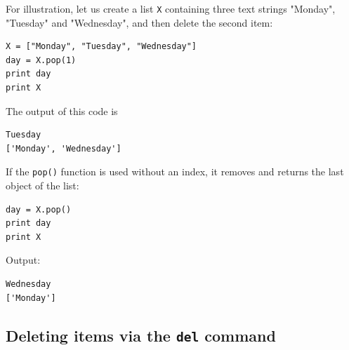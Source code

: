 \noindent
For illustration, let us create a list {\tt X} containing 
three text strings "Monday", "Tuesday" and "Wednesday", and then
delete the second item:\\

\begin{bbox}
\begin{Verbatim}[commandchars=\\\{\}]
X = ["Monday", "Tuesday", "Wednesday"]
day = X.pop(1)
print day
print X
\end{Verbatim}
\end{bbox}
\vspace{6mm}

\noindent
The output of this code is\\

\begin{ybox}
\begin{Verbatim}[commandchars=\\\{\}]
Tuesday
['Monday', 'Wednesday']
\end{Verbatim}
\end{ybox}
\vspace{6mm}

\noindent
If the {\tt pop()} function is used without an index, it removes
and returns the last object of the list:\\

\begin{bbox}
\begin{Verbatim}[commandchars=\\\{\}]
day = X.pop()
print day
print X
\end{Verbatim}
\end{bbox}
\vspace{6mm}

\noindent
Output:\\

\begin{ybox}
\begin{Verbatim}[commandchars=\\\{\}]
Wednesday
['Monday']
\end{Verbatim}
\end{ybox}
\vspace{6mm}

\subsection[\ \ Deleting items via the {\tt del} command]{Deleting items via the {\tt del} command}

